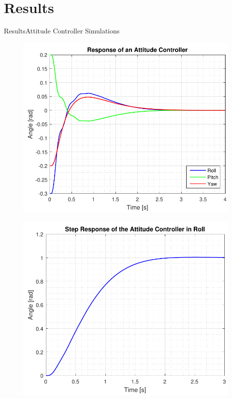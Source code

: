 \section{Results}
\begin{frame}{Results}{Attitude Controller Simulations}
    \begin{minipage}{\linewidth}
        \begin{minipage}{0.49\linewidth}
             \begin{figure}[H]
                 \centering
                 \includegraphics[width=1\textwidth]{figures/attitudeEq} 
                \end{figure}            
          \end{minipage}
          \hspace{0.03\linewidth}
          \begin{minipage}{0.49\linewidth}
             \begin{figure}[H]
                 \centering
                 \includegraphics[width=1\textwidth]{figures/rollStep}  

\end{figure}
\end{minipage}
\end{minipage}
\end{frame}
